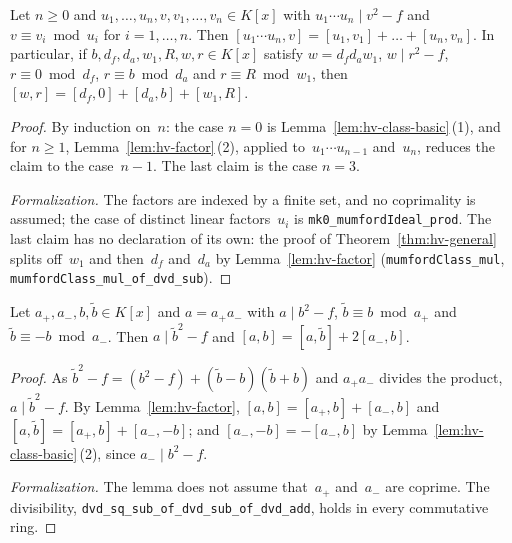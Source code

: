 \begin{lemma}
\label{lem:hv-split}
\leanok
{}
Let $n \ge 0$ and $u_1, \dots, u_n, v, v_1, \dots, v_n \in K[x]$ with
$u_1 \cdots u_n \mid v^2 - f$ and $v \equiv v_i \bmod u_i$ for $i = 1, \dots, n$. Then
$[u_1 \cdots u_n, v] = [u_1, v_1] + \dots + [u_n, v_n]$. In particular, if
$b, d_f, d_a, w_1, R, w, r \in K[x]$ satisfy $w = d_f d_a w_1$, $w \mid r^2 - f$,
$r \equiv 0 \bmod d_f$, $r \equiv b \bmod d_a$ and $r \equiv R \bmod w_1$, then
$[w, r] = [d_f, 0] + [d_a, b] + [w_1, R]$.
\end{lemma}

\begin{proof}
\leanok
{}
By induction on~$n$: the case $n = 0$ is Lemma~\ref{lem:hv-class-basic}\,(1), and for $n \ge 1$,
Lemma~\ref{lem:hv-factor}\,(2), applied to~$u_1 \cdots u_{n-1}$ and~$u_n$, reduces the claim to
the case~$n - 1$. The last claim is the case $n = 3$.

\emph{Formalization.} The factors are indexed by a finite set, and no coprimality is assumed; the
case of distinct linear factors~$u_i$ is \texttt{mk0\_mumfordIdeal\_prod}. The last
claim has no declaration of its own: the proof of Theorem~\ref{thm:hv-general} splits off~$w_1$
and then~$d_f$ and~$d_a$ by Lemma~\ref{lem:hv-factor} (\texttt{mumfordClass\_mul},
\texttt{mumfordClass\_mul\_of\_dvd\_sub}).
\end{proof}

\begin{lemma}
\label{lem:hv-twist}
\leanok
{}
Let $a_+, a_-, b, \tilde b \in K[x]$ and $a = a_+ a_-$ with $a \mid b^2 - f$,
$\tilde b \equiv b \bmod a_+$ and $\tilde b \equiv -b \bmod a_-$. Then $a \mid \tilde b^2 - f$
and $[a, b] = [a, \tilde b] + 2[a_-, b]$.
\end{lemma}

\begin{proof}
\leanok
{}
As $\tilde b^2 - f = (b^2 - f) + (\tilde b - b)(\tilde b + b)$ and $a_+ a_-$ divides the product,
$a \mid \tilde b^2 - f$. By Lemma~\ref{lem:hv-factor}, $[a, b] = [a_+, b] + [a_-, b]$ and
$[a, \tilde b] = [a_+, b] + [a_-, -b]$; and $[a_-, -b] = -[a_-, b]$ by
Lemma~\ref{lem:hv-class-basic}\,(2), since $a_- \mid b^2 - f$.

\emph{Formalization.} The lemma does not assume that~$a_+$ and~$a_-$ are coprime. The
divisibility, \texttt{dvd\_sq\_sub\_of\_dvd\_sub\_of\_dvd\_add}, holds in every commutative ring.
\end{proof}

